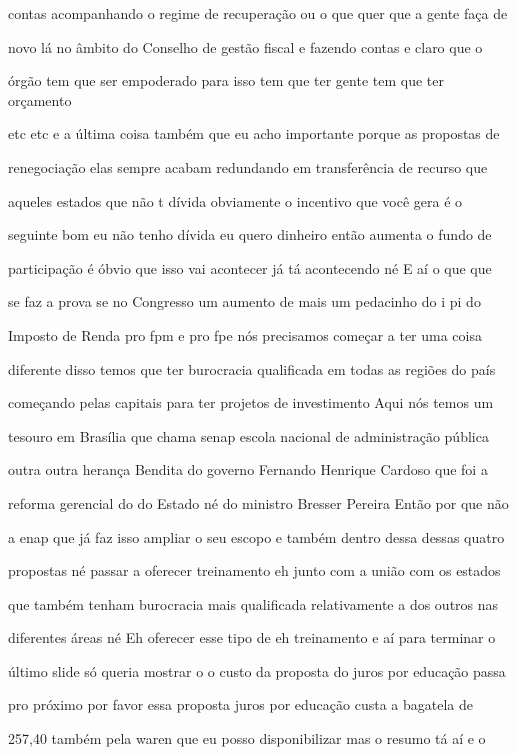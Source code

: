 \documentclass[a4paper,12pt]{article}
\begin{document}
contas acompanhando o regime de recuperação ou o que quer que a gente faça de

novo lá no âmbito do Conselho de gestão fiscal e fazendo contas e claro que o

órgão tem que ser empoderado para isso tem que ter gente tem que ter orçamento

etc etc e a última coisa também que eu acho importante porque as propostas de

renegociação elas sempre acabam redundando em transferência de recurso que

aqueles estados que não t dívida obviamente o incentivo que você gera é o

seguinte bom eu não tenho dívida eu quero dinheiro então aumenta o fundo de

participação é óbvio que isso vai acontecer já tá acontecendo né E aí o que que

se faz a prova se no Congresso um aumento de mais um pedacinho do i pi do

Imposto de Renda pro fpm e pro fpe nós precisamos começar a ter uma coisa

diferente disso temos que ter burocracia qualificada em todas as regiões do país

começando pelas capitais para ter projetos de investimento Aqui nós temos um

tesouro em Brasília que chama senap escola nacional de administração pública

outra outra herança Bendita do governo Fernando Henrique Cardoso que foi a

reforma gerencial do do Estado né do ministro Bresser Pereira Então por que não

a enap que já faz isso ampliar o seu escopo e também dentro dessa dessas quatro

propostas né passar a oferecer treinamento eh junto com a união com os estados

que também tenham burocracia mais qualificada relativamente a dos outros nas

diferentes áreas né Eh oferecer esse tipo de eh treinamento e aí para terminar o

último slide só queria mostrar o o custo da proposta do juros por educação passa

pro próximo por favor essa proposta juros por educação custa a bagatela de

257,40 também pela waren que eu posso disponibilizar mas o resumo tá aí e o
\end{document}
